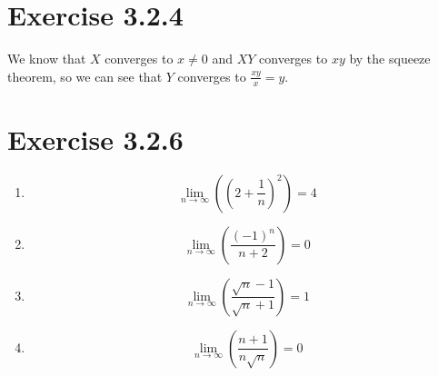 \documentclass[11pt]{article}
\begin{document}
    \section*{Exercise 3.2.4}
    We know that $X$ converges to $x\neq 0$ and $XY$ converges to $xy$ by the squeeze theorem, so we can see that $Y$ converges to $\frac{xy}{x}=y$.

    \section*{Exercise 3.2.6}
    \begin{enumerate}[label=\alph*)]
        \item \[ \lim_{n\to\infty}\left({\left(2+\frac{1}{n}\right)}^2\right) = 4\]
        \item \[ \lim_{n\to\infty}\left(\frac{{(-1)}^n}{n+2} \right) = 0 \]
        \item \[ \lim_{n\to\infty}\left(\frac{\sqrt{n}-1}{\sqrt{n}+1}\right) = 1 \]
        \item \[ \lim_{n\to\infty}\left(\frac{n+1}{n\sqrt{n}}\right) = 0 \]
    \end{enumerate}
\end{document}
